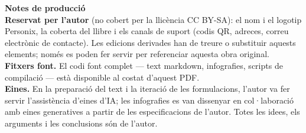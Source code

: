 \clearpage
\thispagestyle{empty}
\begin{flushleft}\small\sffamily
\textbf{Notes de producció}\\[1.2em]

\textbf{Reservat per l'autor} (no cobert per la llicència CC BY-SA): el nom i
el logotip Personix, la coberta del llibre i els canals de suport (codis QR,
adreces, correu electrònic de contacte). Les edicions derivades han de treure
o substituir aquests elements; només es poden fer servir per referenciar
aquesta obra original.\\[1.2em]

\textbf{Fitxers font.} El codi font complet --- text markdown, infografies,
scripts de compilació --- està disponible al costat d'aquest PDF.\\[1.2em]

\textbf{Eines.} En la preparació del text i la iteració de les formulacions,
l'autor va fer servir l'assistència d'eines d'IA; les infografies es van
dissenyar en col·laboració amb eines generatives a partir de les
especificacions de l'autor. Totes les idees, els arguments i les conclusions
són de l'autor.
\end{flushleft}
\clearpage
